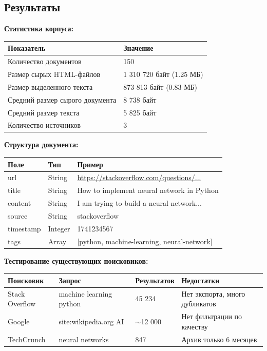 \documentclass[a4paper, 12pt]{article}
\begin{document}
\subsection*{Результаты}
\textbf{Статистика корпуса:}
\begin{table}[h]
\begin{tabular}{|l|l|}
\hline
\textbf{Показатель} & \textbf{Значение} \\ \hline
Количество документов & 150 \\ \hline
Размер сырых HTML-файлов & 1 310 720 байт (1.25 МБ) \\ \hline
Размер выделенного текста & 873 813 байт (0.83 МБ) \\ \hline
Средний размер сырого документа & 8 738 байт \\ \hline
Средний размер текста & 5 825 байт \\ \hline
Количество источников & 3 \\ \hline
\end{tabular}
\end{table}

\textbf{Структура документа:}
\begin{table}[h]
\begin{tabular}{|l|l|p{9cm}|}
\hline
\textbf{Поле} & \textbf{Тип} & \textbf{Пример} \\ \hline
url & String & \url{https://stackoverflow.com/questions/...} \\ \hline
title & String & How to implement neural network in Python \\ \hline
content & String & I am trying to build a neural network... \\ \hline
source & String & stackoverflow \\ \hline
timestamp & Integer & 1741234567 \\ \hline
tags & Array & [python, machine-learning, neural-network] \\ \hline
\end{tabular}
\end{table}

\textbf{Тестирование существующих поисковиков:}
\begin{table}[h]
\begin{tabular}{|p{3cm}|p{4cm}|p{2cm}|p{5cm}|}
\hline
\textbf{Поисковик} & \textbf{Запрос} & \textbf{Результатов} & \textbf{Недостатки} \\ \hline
Stack Overflow & machine learning python & 45 234 & Нет экспорта, много дубликатов \\ \hline
Google & site:wikipedia.org AI & $\sim$12 000 & Нет фильтрации по качеству \\ \hline
TechCrunch & neural networks & 847 & Архив только 6 месяцев \\ \hline
\end{tabular}
\end{table}
\end{document}
